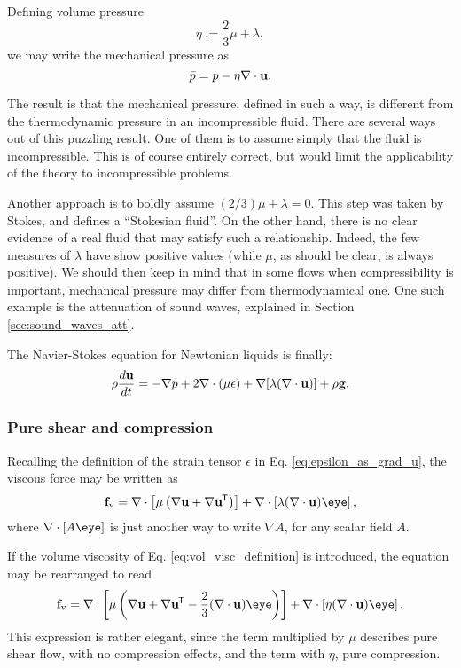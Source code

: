 Defining volume pressure
\begin{equation}
  \label{eq:vol_visc_definition}
  \eta:=\frac23 \mu  + \lambda,
\end{equation}
we may write the mechanical pressure as
\[
  \bar{p}=
  p - \eta \nabla\cdot \mathbf{u} .
\]

The result is that the mechanical pressure, defined in such a way, is
different from the thermodynamic pressure in an incompressible fluid.
There are several ways out of this puzzling result. One of them is to
assume simply that the fluid is incompressible. This is of course
entirely correct, but would limit the applicability of the theory to
incompressible problems.

Another approach is to boldly assume $( 2/3 ) \mu+\lambda=0$. This
step was taken by Stokes, and defines a ``Stokesian fluid''. On the
other hand, there is no clear evidence of a real fluid that may
satisfy such a relationship. Indeed, the few measures of $\lambda$
have show positive values (while $\mu$, as should be clear, is always
positive). We should then keep in mind that in some flows when
compressibility is important, mechanical pressure may differ from
thermodynamical one. One such example is the attenuation of sound
waves, explained in Section \ref{sec:sound_waves_att}.

The Navier-Stokes equation for Newtonian liquids is finally:
\begin{equation}
  \label{eq:NS_Newtonian}
  \rho \frac{d\mathbf{u} }{dt} =
  - \nabla p +
  2 \nabla \cdot ( \mu \epsilon)
  + \nabla [ \lambda ( \nabla\cdot\mathbf{u} ) ]
  + \rho \mathbf{g} .
\end{equation}


\subsubsection{Pure shear and compression}

Recalling the definition of the strain tensor $\epsilon$
in Eq. \ref{eq:epsilon_as_grad_u}, the viscous force may be written as
\begin{equation*}
  \bff_\mathrm{v}=
  \nabla \cdot \left[ \mu  \left( \nabla\bfu + \nabla\bfu\tran \right) \right] +
  \nabla \cdot \left[ \lambda (\divu) \eye \right] ,
\end{equation*}
where $\nabla \cdot \left[ A \eye \right] $ is just another way to
write $\nabla A$, for any scalar field $A$.


If the volume viscosity of Eq. \ref{eq:vol_visc_definition} is
introduced, the equation may be rearranged to read
\begin{equation}
  \label{eq:pure_stress_pure_compression}
  \bff_\mathrm{v}=
  \nabla \cdot \left[ \mu  \left(
      \nabla\bfu + \nabla\bfu\tran  - \frac23 (\divu)  \eye
    \right)
  \right] +
  \nabla \cdot \left[ \eta (\divu) \eye \right] .
\end{equation}
This expression is rather elegant, since the term multiplied by $\mu$
describes pure shear flow, with no compression effects, and the term
with $\eta$, pure compression.

